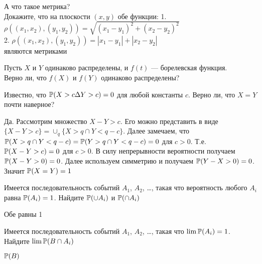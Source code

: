 \begin{problem}
 А что такое метрика? \\
Докажите, что на плоскости $(x,y)$ обе функции:
1. $\rho((x_{1},x_{2}),(y_{1},y_{2}))=\sqrt{(x_{1}-y_{1})^{2}+(x_{2}-y_{2})^{2}}$ \\
2. $\rho((x_{1},x_{2}),(y_{1},y_{2}))=|x_{1}-y_{1}|+|x_{2}-y_{2}|$ \\
являются метриками

\begin{sol}

\end{sol}
\end{problem}

\begin{problem}
Пусть $X$ и $Y$ одинаково распределены, и $f(t)$ — борелевская
функция. \\
Верно ли, что $f(X)$ и $f(Y)$ одинаково распределены?

\begin{sol}

\end{sol}
\end{problem}

\begin{problem}
Известно, что $ \P(X>c \Delta Y>c)=0 $ для любой константы $ c $. Верно ли, что $X=Y$ почти наверное?

\begin{sol}
Да. Рассмотрим множество $ X-Y>c $. Его можно представить в виде $ \{X-Y>c\}=\cup_{q} \{ X>q \cap Y<q-c\} $. Далее замечаем, что $ \P(X>q \cap Y<q-c)=\P(Y>q \cap Y<q-c)=0 $ для $ c>0 $. Т.е. $ \P(X-Y>c)=0 $ для $ c>0 $. В силу непрерывности вероятности получаем $ \P(X-Y>0)=0 $. Далее используем симметрию и получаем $ \P(Y-X>0)=0 $. Значит $ \P(X=Y)=1 $
\end{sol}
\end{problem}

\begin{problem}
Имеется последовательность событий $A_1$, $A_2$, \ldots, такая что вероятность любого $A_i$ равна $\P(A_i)=1$. Найдите $\P(\cup A_i)$ и $\P(\cap A_i)$

\begin{sol}
Обе равны 1
\end{sol}
\end{problem}

\begin{problem}
Имеется последовательность событий $A_1$, $A_2$, \ldots, такая что $\lim \P(A_i)=1$. Найдите $\lim \P(B\cap A_i)$

\begin{sol}
$\P(B)$
\end{sol}
\end{problem}


